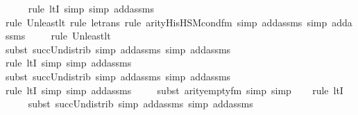 \begin{isabellebody}
\ \ \ \ \isamarkupfalse%
{\isacharparenleft}{\kern0pt}rule\ ltI{\isacharcomma}{\kern0pt}\ simp{\isacharcomma}{\kern0pt}\ simp\ add{\isacharcolon}{\kern0pt}assms{\isacharparenright}{\kern0pt}\isanewline
\ \ \ \isamarkupfalse%
{\isacharparenleft}{\kern0pt}rule\ Un{\isacharunderscore}{\kern0pt}least{\isacharunderscore}{\kern0pt}lt{\isacharcomma}{\kern0pt}\ rule\ le{\isacharunderscore}{\kern0pt}trans{\isacharcomma}{\kern0pt}\ rule\ arity{\isacharunderscore}{\kern0pt}His{\isacharunderscore}{\kern0pt}HS{\isacharunderscore}{\kern0pt}M{\isacharunderscore}{\kern0pt}cond{\isacharunderscore}{\kern0pt}fm{\isacharprime}{\kern0pt}{\isacharcomma}{\kern0pt}\ simp\ add{\isacharcolon}{\kern0pt}assms{\isacharcomma}{\kern0pt}\ simp\ add{\isacharcolon}{\kern0pt}assms{\isacharparenright}{\kern0pt}\isanewline
\ \ \ \ \isamarkupfalse%
{\isacharparenleft}{\kern0pt}rule\ Un{\isacharunderscore}{\kern0pt}least{\isacharunderscore}{\kern0pt}lt{\isacharparenright}{\kern0pt}\isanewline
\ \ \ \ \ \isamarkupfalse%
{\isacharparenleft}{\kern0pt}subst\ succ{\isacharunderscore}{\kern0pt}Un{\isacharunderscore}{\kern0pt}distrib{\isacharcomma}{\kern0pt}\ simp\ add{\isacharcolon}{\kern0pt}assms{\isacharcomma}{\kern0pt}\ simp\ add{\isacharcolon}{\kern0pt}assms{\isacharparenright}{\kern0pt}{\isacharplus}{\kern0pt}\isanewline
\ \ \ \ \ \isamarkupfalse%
{\isacharparenleft}{\kern0pt}rule\ ltI{\isacharcomma}{\kern0pt}\ simp{\isacharcomma}{\kern0pt}\ simp\ add{\isacharcolon}{\kern0pt}assms{\isacharparenright}{\kern0pt}\isanewline
\ \ \ \ \isamarkupfalse%
{\isacharparenleft}{\kern0pt}subst\ succ{\isacharunderscore}{\kern0pt}Un{\isacharunderscore}{\kern0pt}distrib{\isacharcomma}{\kern0pt}\ simp\ add{\isacharcolon}{\kern0pt}assms{\isacharcomma}{\kern0pt}\ simp\ add{\isacharcolon}{\kern0pt}assms{\isacharparenright}{\kern0pt}{\isacharplus}{\kern0pt}\isanewline
\ \ \ \ \isamarkupfalse%
{\isacharparenleft}{\kern0pt}rule\ ltI{\isacharcomma}{\kern0pt}\ simp{\isacharcomma}{\kern0pt}\ simp\ add{\isacharcolon}{\kern0pt}assms{\isacharparenright}{\kern0pt}\isanewline
\ \ \ \isamarkupfalse%
\ {\isacharparenleft}{\kern0pt}subst\ arity{\isacharunderscore}{\kern0pt}empty{\isacharunderscore}{\kern0pt}fm{\isacharcomma}{\kern0pt}\ simp{\isacharcomma}{\kern0pt}\ simp{\isacharparenright}{\kern0pt}\isanewline
\ \ \isamarkupfalse%
\ {\isacharparenleft}{\kern0pt}rule\ ltI{\isacharparenright}{\kern0pt}\isanewline
\ \ \ \ \isamarkupfalse%
{\isacharparenleft}{\kern0pt}subst\ succ{\isacharunderscore}{\kern0pt}Un{\isacharunderscore}{\kern0pt}distrib{\isacharcomma}{\kern0pt}\ simp\ add{\isacharcolon}{\kern0pt}assms{\isacharcomma}{\kern0pt}\ simp\ add{\isacharcolon}{\kern0pt}assms{\isacharparenright}{\kern0pt}{\isacharplus}{\kern0pt}\isanewline

\end{isabellebody}
